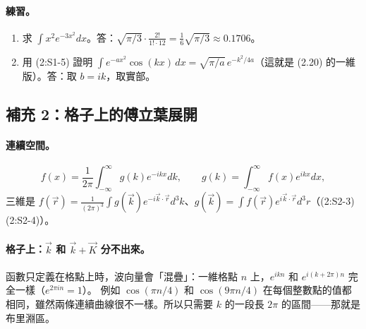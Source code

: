 \paragraph{練習。}
\begin{enumerate}
\item 求 $\int x^2e^{-3x^2}dx$。\quad 答：$\sqrt{\pi/3}\cdot\frac{2!}{1!\cdot12}=\frac16\sqrt{\pi/3}\approx0.1706$。
\item 用 (2:S1-5) 證明 $\int e^{-ax^2}\cos(kx)\,dx=\sqrt{\pi/a}\,e^{-k^2/4a}$（這就是 (2.20) 的一維版）。\quad 答：取 $b=ik$，取實部。
\end{enumerate}

\subsection{補充 2：格子上的傅立葉展開}

\paragraph{連續空間。}
\[f(x)=\frac1{2\pi}\int_{-\infty}^\infty g(k)e^{-ikx}dk,\qquad g(k)=\int_{-\infty}^\infty f(x)e^{ikx}dx,\tag{2:S2-1, 2:S2-2}\]
三維是 $f(\vec r)=\frac1{(2\pi)^3}\int g(\vec k)e^{-i\vec k\cdot\vec r}d^3k$、$g(\vec k)=\int f(\vec r)e^{i\vec k\cdot\vec r}d^3r$（(2:S2-3)(2:S2-4)）。

\paragraph{格子上：$\vec k$ 和 $\vec k+\vec K$ 分不出來。}
函數只定義在格點上時，波向量會「混疊」：一維格點 $n$ 上，$e^{ikn}$ 和 $e^{i(k+2\pi)n}$ 完全一樣（$e^{2\pi in}=1$）。
例如 $\cos(\pi n/4)$ 和 $\cos(9\pi n/4)$ 在每個整數點的值都相同，雖然兩條連續曲線很不一樣。所以只需要 $k$ 的一段長 $2\pi$ 的區間——那就是布里淵區。

